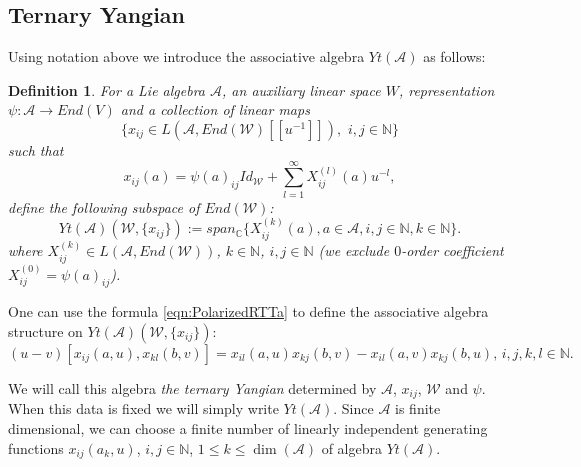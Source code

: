 \documentclass[10pt]{article}%
\numberwithin{equation}{section}
\newtheorem{defin}[thm]{Definition}
\newcommand{\red}{\color{red}}
\def\dim{\operatorname{dim}}
\begin{document}
\subsection{Ternary Yangian}
  Using notation above we introduce the associative algebra %
 $Yt(\mathcal{A})$ as follows:
 \begin{defin}\label{def:TernaryYangian}
For a Lie algebra $\mathcal{A}$, an auxiliary linear space $W$,  representation $\psi:\mathcal{A}\to End(V)$ and a collection of linear maps 
$$\{x_{ij}\in L(\mathcal{A}, End(\mathcal{W})[[u^{-1}]]), \,\, i,j\in\mathbb{N}\}$$
 such that
$$x_{ij}(a)=\psi(a)_{ij}Id_{\mathcal{W}}+\sum\limits_{l=1}^{\infty}X_{ij}^{(l)}(a) u^{-l}, $$
define the following subspace of $End(\mathcal{W})$:
\begin{equation}
Yt(\mathcal{A})(\mathcal{W}, \{x_{ij}\}):=span_{\mathbb C}\{X_{ij}^{(k)}(a), a\in \mathcal{A}, i,j\in\mathbb{N}, k\in \mathbb{N}\}.
\end{equation}
where $X_{ij}^{(k)}\in L(\mathcal{A}, End(\mathcal{W}))$, $k\in \mathbb{N}$, $i,j\in\mathbb{N}$ (we exclude $0$-order coefficient $X_{ij}^{(0)}=\psi(a)_{ij}$).
\end{defin}

One can use the formula \eqref{eqn:PolarizedRTTa} to define the associative algebra structure on $Yt(\mathcal{A})(\mathcal{W}, \{x_{ij}\})$:
\begin{equation}\label{eqn:PolarizedRTTa_X}
(u-v)[x_{ij}(a,u),x_{kl}(b,v)]=x_{il}(a,u)x_{kj}(b,v)-x_{il}(a,v)x_{kj}(b,u),\,i,j,k,l\in\mathbb{N}.
\end{equation}

 

 
We will call this algebra \emph{the ternary Yangian} determined by $\mathcal{A}$, $x_{ij}$, $\mathcal{W}$ and $\psi$. When this data is fixed we will simply write $Yt(\mathcal{A})$. 
Since $\mathcal{A}$ is finite dimensional, we can choose a finite number of linearly independent generating functions $x_{ij}(a_k,u)$, $i,j\in\mathbb{N}$, $1\leq k\leq \dim(\mathcal{A})$ of algebra $Yt(\mathcal{A})$.
\end{document}
